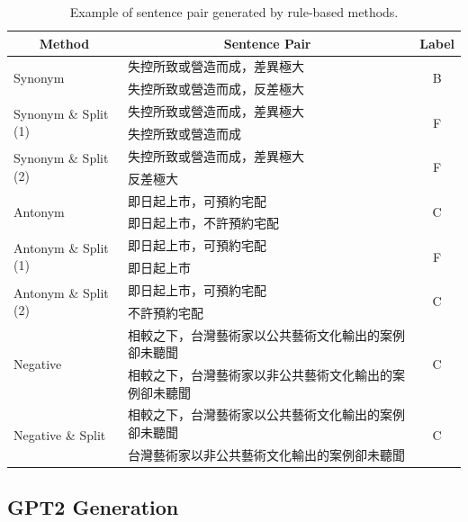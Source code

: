 \documentclass{article}
\begin{document}
\begin{CJK*}{UTF8}{bkai}
\begin{table}[ht!]
  \centering
  \begin{tabular}{|l|l|c|}
    \hline
    \multicolumn{1}{|c|}{Method} & \multicolumn{1}{c|}{Sentence Pair} & Label \\ \hline
    \multirow{2}{*}{Synonym} & 失控所致或營造而成，差異極大 & \multirow{2}{*}{B} \\ \cline{2-2}
    & 失控所致或營造而成，反差極大 &  \\ \hline
    \multirow{2}{*}{Synonym \& Split (1)} & 失控所致或營造而成，差異極大 & \multirow{2}{*}{F} \\ \cline{2-2}
    & 失控所致或營造而成 &  \\ \hline
    \multirow{2}{*}{Synonym \& Split (2)} & 失控所致或營造而成，差異極大 & \multirow{2}{*}{F} \\ \cline{2-2}
    & 反差極大 &  \\ \hline
    \multirow{2}{*}{Antonym} & 即日起上市，可預約宅配 & \multirow{2}{*}{C} \\ \cline{2-2}
    & 即日起上市，不許預約宅配 &  \\ \hline
    \multirow{2}{*}{Antonym \& Split (1)} & 即日起上市，可預約宅配 & \multirow{2}{*}{F} \\ \cline{2-2}
    & 即日起上市 &  \\ \hline
    \multirow{2}{*}{Antonym \& Split (2)} & 即日起上市，可預約宅配 & \multirow{2}{*}{C} \\ \cline{2-2}
    & 不許預約宅配 &  \\ \hline
    \multirow{2}{*}{Negative} & 相較之下，台灣藝術家以公共藝術文化輸出的案例卻未聽聞 & \multirow{2}{*}{C} \\ \cline{2-2}
    & 相較之下，台灣藝術家以非公共藝術文化輸出的案例卻未聽聞 &  \\ \hline
    \multirow{2}{*}{Negative \& Split} & 相較之下，台灣藝術家以公共藝術文化輸出的案例卻未聽聞 & \multirow{2}{*}{C} \\ \cline{2-2}
    & 台灣藝術家以非公共藝術文化輸出的案例卻未聽聞 &  \\ \hline
  \end{tabular}
  \caption{Example of sentence pair generated by rule-based methods.}
  \label{example:sim_nli_rule_based}
\end{table}

\subsection{GPT2 Generation}

\end{CJK*}
\end{document}
